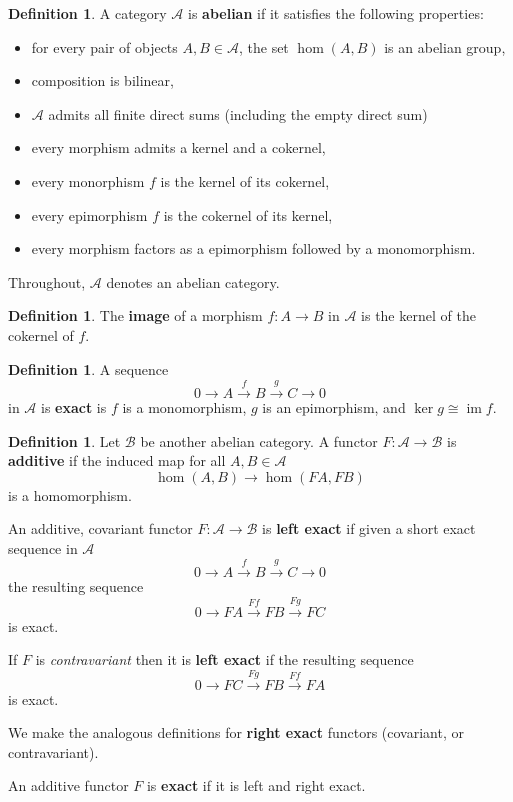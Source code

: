 \documentclass[12pt]{article}
\theoremstyle{plain}
\theoremstyle{definition}
\newtheorem{defn}[thm]{Definition} %
\newcommand{\scr}[1]{\mathscr{#1}}
\newcommand{\lto}{\longrightarrow}
\begin{document}
\begin{defn}
A category $\scr{A}$ is \textbf{abelian} if it satisfies the following properties:
\begin{itemize}
\item for every pair of objects $A,B \in \scr{A}$, the set $\operatorname{hom}(A,B)$ is an abelian group,
\item composition is bilinear,
\item $\scr{A}$ admits all finite direct sums (including the empty direct sum)
\item every morphism admits a kernel and a cokernel,
\item every monorphism $f$ is the kernel of its cokernel,
\item every epimorphism $f$ is the cokernel of its kernel,
\item every morphism factors as a epimorphism followed by a monomorphism.
\end{itemize}
\end{defn}
Throughout, $\scr{A}$ denotes an abelian category.
\begin{defn}
The \textbf{image} of a morphism $f: A \lto B$ in $\scr{A}$ is the kernel of the cokernel of $f$.
\end{defn}
\begin{defn}
A sequence
\begin{equation}
0 \lto A \stackrel{f}{\lto} B \stackrel{g}{\lto}C \lto 0
\end{equation}
in $\scr{A}$ is \textbf{exact} is $f$ is a monomorphism, $g$ is an epimorphism, and $\operatorname{ker}g \cong \operatorname{im}f$.
\end{defn}
\begin{defn}
Let $\scr{B}$ be another abelian category. A functor $F: \scr{A} \lto \scr{B}$ is \textbf{additive} if the induced map for all $A,B \in \scr{A}$
\begin{equation}
\operatorname{hom}(A,B) \lto \operatorname{hom}(FA,FB)
\end{equation}
is a homomorphism.

An additive, covariant functor $F: \scr{A} \lto \scr{B}$ is \textbf{left exact} if given a short exact sequence in $\scr{A}$
\begin{equation}
0 \lto A \stackrel{f}{\lto} B \stackrel{g}{\lto}C \lto 0
\end{equation}
the resulting sequence
\begin{equation}
0 \lto FA \stackrel{Ff}{\lto} FB \stackrel{Fg}{\lto}FC
\end{equation}
is exact.

If $F$ is \emph{contravariant} then it is \textbf{left exact} if the resulting sequence
\begin{equation}
0 \lto FC \stackrel{Fg}{\lto} FB \stackrel{Ff}{\lto} FA
\end{equation}
is exact.

We make the analogous definitions for \textbf{right exact} functors (covariant, or contravariant).

An additive functor $F$ is \textbf{exact} if it is left and right exact.
\end{defn}
\end{document}
